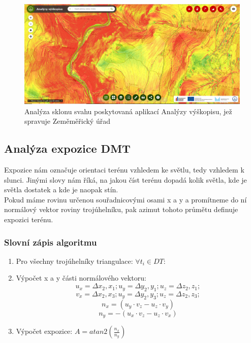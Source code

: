 \documentclass[a4paper,11pt,twoside]{article}
\begin{document}
\vspace{0.2cm}
\begin{figure}[hbt!] 
\begin{center}
\includegraphics[width=15cm]{pictures/analyzy_sklon.png} 
\caption[Analýza sklonu svahu poskytovaná aplikací Analýzy výškopisu, jež spravuje Zeměměřický úřad]{Analýza sklonu svahu poskytovaná aplikací Analýzy výškopisu, jež spravuje Zeměměřický úřad \cite{analyzyCUZK}}
\label{fig:jar}
\end{center}
\end{figure}

\subsection{Analýza expozice DMT}
Expozice nám označuje orientaci terénu vzhledem ke světlu, tedy vzhledem k slunci. Jinými slovy nám říká, na jakou číst terénu dopadá kolik světla, kde je světla dostatek a kde je naopak stín. \\
\indent Pokud máme rovinu určenou souřadnicovými osami x a y a promítneme do ní normálový vektor roviny trojúhelníku, pak azimut tohoto průmětu definuje expozici terénu.


\subsubsection{Slovní zápis algoritmu}
\begin{enumerate}
\item Pro všechny trojúhelníky triangulace: $ \forall t_i \in DT: $
\item Výpočet x a y části normálového vektoru:
$$  u_x = \Delta x_2, x_1; u_y = \Delta y_2, y_1; u_z = \Delta z_2, z_1;$$
$$  v_x = \Delta x_2, x_3; u_y = \Delta y_2, y_3; u_z = \Delta z_2, z_3;$$
$$ n_x = (u_y \cdot v_z - u_z \cdot v_y) $$
$$ n_y = -(u_x \cdot v_z - u_z \cdot v_x) $$
\item Výpočet expozice: $ A =atan2( \frac{n_x}{n_y}) $
\end{enumerate}
\end{document}
